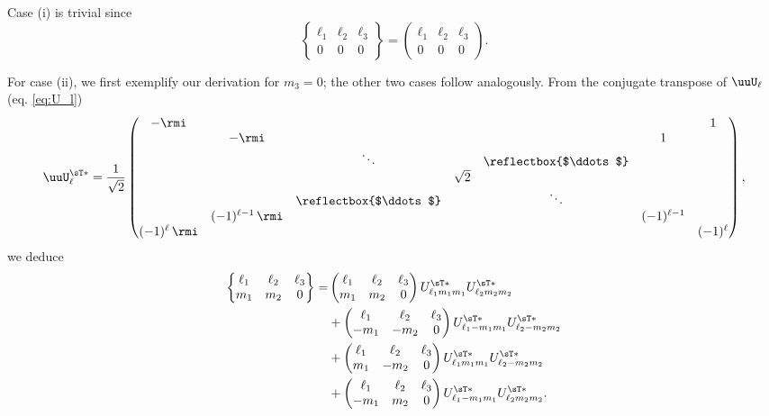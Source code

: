 Case (i) is trivial since
\begin{equation}\label{eq:w3j-rsph-expr1}
    \begin{Bmatrix}
        \ell_1 & \ell_2 & \ell_3 \\ 0 & 0 & 0
    \end{Bmatrix}
    =
    \begin{pmatrix}
        \ell_1 & \ell_2 & \ell_3 \\ 0 & 0 & 0
    \end{pmatrix}
    .
\end{equation}

For case (ii), we first exemplify our derivation for $m_3 = 0$; the other two cases follow analogously. From the conjugate transpose of $\uuU_\ell$ (eq. \eqref{eq:U_l})
\begin{equation}\label{eq:U_l_conj_transp}
    \uuU_\ell^{\sT\ast} =
    \frac{1}{\sqrt{2}}
    \begin{pmatrix}
        -\rmi &&&&&& 1 \\
        & -\rmi &&&& 1 & \\
        && \ddots && \reflectbox{$\ddots$} && \\
        &&& \sqrt{2} &&& \\
        && \reflectbox{$\ddots$} && \ddots && \\
        & (-1)^{\ell-1}\,\rmi &&&& (-1)^{\ell-1} & \\
        (-1)^\ell\,\rmi &&&&&& (-1)^\ell
    \end{pmatrix}
    ,
\end{equation}
we deduce
\begin{equation}
\begin{aligned}
    \begin{Bmatrix}
        \ell_1 & \ell_2 & \ell_3 \\ m_1 & m_2 & 0
    \end{Bmatrix}
    =&
    \begin{pmatrix}
        \ell_1 & \ell_2 & \ell_3 \\ m_1 & m_2 & 0
    \end{pmatrix}
    U^{\sT\ast}_{\ell_1 m_1m_1} U^{\sT\ast}_{\ell_2 m_2m_2} \\
    &+
    \begin{pmatrix}
        \ell_1 & \ell_2 & \ell_3 \\ -m_1 & -m_2 & 0
    \end{pmatrix}
    U^{\sT\ast}_{\ell_1 -m_1m_1} U^{\sT\ast}_{\ell_2 -m_2m_2} \\
    &+
    \begin{pmatrix}
        \ell_1 & \ell_2 & \ell_3 \\ m_1 & -m_2 & 0
    \end{pmatrix}
    U^{\sT\ast}_{\ell_1 m_1m_1} U^{\sT\ast}_{\ell_2 -m_2m_2} \\
    &+
    \begin{pmatrix}
        \ell_1 & \ell_2 & \ell_3 \\ -m_1 & m_2 & 0
    \end{pmatrix}
    U^{\sT\ast}_{\ell_1 -m_1m_1} U^{\sT\ast}_{\ell_2 m_2m_2}
    .
\end{aligned}
\end{equation}
